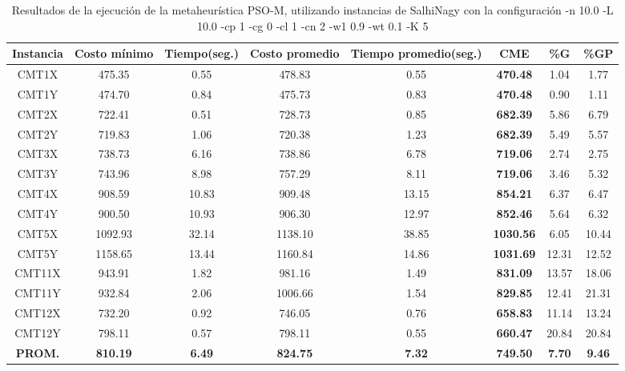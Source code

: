 \begin{table}[h]
\caption{Resultados de la ejecución de la metaheurística PSO-M, utilizando instancias de SalhiNagy con la configuración -n 10.0 -L 10.0 -cp 1 -cg 0 -cl 1 -cn 2 -w1 0.9 -wt 0.1 -K 5}
\centering
\small
\begin{tabular}{c c c c c c c c}
\hline\hline
Instancia & Costo mínimo & Tiempo(seg.) & Costo promedio & Tiempo promedio(seg.) & CME & \%G & \%GP \\ [0.5ex]
\hline
CMT1X & 475.35 & 0.55 & 
478.83 & 0.55 & \bf{470.48} & 
1.04 & 1.77\\CMT1Y & 474.70 & 0.84 & 
475.73 & 0.83 & \bf{470.48} & 
0.90 & 1.11\\CMT2X & 722.41 & 0.51 & 
728.73 & 0.85 & \bf{682.39} & 
5.86 & 6.79\\CMT2Y & 719.83 & 1.06 & 
720.38 & 1.23 & \bf{682.39} & 
5.49 & 5.57\\CMT3X & 738.73 & 6.16 & 
738.86 & 6.78 & \bf{719.06} & 
2.74 & 2.75\\CMT3Y & 743.96 & 8.98 & 
757.29 & 8.11 & \bf{719.06} & 
3.46 & 5.32\\CMT4X & 908.59 & 10.83 & 
909.48 & 13.15 & \bf{854.21} & 
6.37 & 6.47\\CMT4Y & 900.50 & 10.93 & 
906.30 & 12.97 & \bf{852.46} & 
5.64 & 6.32\\CMT5X & 1092.93 & 32.14 & 
1138.10 & 38.85 & \bf{1030.56} & 
6.05 & 10.44\\CMT5Y & 1158.65 & 13.44 & 
1160.84 & 14.86 & \bf{1031.69} & 
12.31 & 12.52\\CMT11X & 943.91 & 1.82 & 
981.16 & 1.49 & \bf{831.09} & 
13.57 & 18.06\\CMT11Y & 932.84 & 2.06 & 
1006.66 & 1.54 & \bf{829.85} & 
12.41 & 21.31\\CMT12X & 732.20 & 0.92 & 
746.05 & 0.76 & \bf{658.83} & 
11.14 & 13.24\\CMT12Y & 798.11 & 0.57 & 
798.11 & 0.55 & \bf{660.47} & 
20.84 & 20.84\\\bf{PROM.} & 
\bf{810.19} & \bf{6.49} & \bf{824.75} & \bf{7.32} & \bf{749.50} & \bf{7.70} & \bf{9.46}\\[1ex]\hline
\end{tabular}
\label{table:PSO-M-dethloff}
\end{table}
